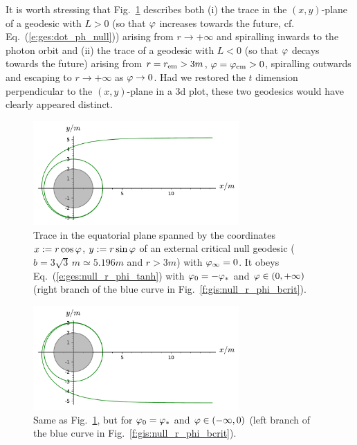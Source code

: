 It is worth stressing that Fig.~\ref{f:gis:null_b_crit_from_inf_L_pos} describes both (i) the trace
in the $(x,y)$-plane of a
geodesic with $L>0$ (so that $\varphi$ increases towards the future, cf. Eq.~(\ref{e:ges:dot_ph_null})) arising from $r\to + \infty$
and spiralling inwards to the photon orbit
and (ii) the trace of a geodesic with $L<0$ (so that $\varphi$ decays towards the future)
arising from $r=r_{\rm em} > 3 m$, $\varphi=\varphi_{\rm em}>0$,
spiralling outwards and escaping to $r\to +\infty$ as $\varphi\to 0$. Had we restored the
$t$ dimension perpendicular to the $(x,y)$-plane in a 3d plot, these two geodesics would have
clearly appeared distinct.

\begin{figure}
\centerline{\includegraphics[width=0.7\textwidth]{ges_null_b_crit_from_inf_L_pos.pdf}}
\caption[]{\label{f:gis:null_b_crit_from_inf_L_pos} \footnotesize
Trace in the equatorial plane spanned by the coordinates $x:=r\cos\varphi$, $y:=r\sin\varphi$
of an external critical null geodesic ($b = 3\sqrt{3} \, m \simeq 5.196 m$ and
$r>3m$) with $\varphi_\infty=0$.
It obeys Eq.~(\ref{e:ges:null_r_phi_tanh}) with $\varphi_0 = -\varphi_*$ and $\varphi\in(0,+\infty)$
(right branch of the blue curve in Fig.~\ref{f:gis:null_r_phi_bcrit}).}
\end{figure}

\begin{figure}
\centerline{\includegraphics[width=0.7\textwidth]{ges_null_b_crit_from_inf_L_neg.pdf}}
\caption[]{\label{f:gis:null_b_crit_from_inf_L_neg} \footnotesize
Same as Fig.~\ref{f:gis:null_b_crit_from_inf_L_pos}, but for $\varphi_0 = \varphi_*$
and $\varphi\in(-\infty,0)$ (left branch of the blue curve in Fig.~\ref{f:gis:null_r_phi_bcrit}).}
\end{figure}

